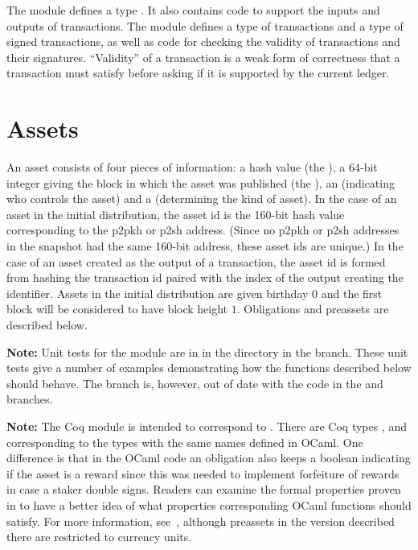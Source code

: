 The module  defines a type {}.
It also contains code to support the inputs and outputs of transactions.
The module  defines a type {} of transactions
and a type {} of signed transactions,
as well as code for checking the validity of transactions
and their signatures.
``Validity'' of a transaction is a weak form of correctness
that a transaction must satisfy before asking if it is supported by the current ledger.

\section{Assets}

An asset consists of four pieces of information:
a hash value (the {}),
a 64-bit integer giving the block in which the asset was published (the {}),
an {} (indicating who controls the asset)
and a {} (determining the kind of asset).
In the case of an asset in the initial distribution,
the asset id is the 160-bit hash value corresponding to the p2pkh or p2sh address.
(Since no p2pkh or p2sh addresses in the snapshot had the same 160-bit address,
these asset ids are unique.)
In the case of an asset created as the output of a transaction,
the asset id is formed from hashing the transaction id paired with the index of the output
creating the identifier.
Assets in the initial distribution are given birthday $0$
and the first block will be considered to have block height $1$.
Obligations and preassets are described below.

{\bf{Note:}} Unit tests for the {} module are in {}
in the {}
directory in the {} branch.
These unit tests give a number of examples demonstrating how the functions described below should behave.
The {} branch is, however, out of date with the code in the {} and {} branches.

{\bf{Note:}} The Coq module {} is intended to correspond to {}.
There are Coq types {}, {} and {}
corresponding to the types with the same names defined in OCaml.
One difference is that in the OCaml code an obligation also keeps a boolean indicating if the
asset is a reward since this was needed to implement forfeiture of rewards in case a staker
double signs.
Readers can examine the formal properties proven in {} to have a better
idea of what properties corresponding OCaml functions should satisfy.
For more information, see~\cite{White2015b}, although preassets in the version described there are restricted to currency units.

